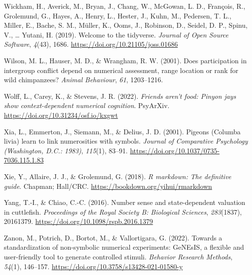 \documentclass[
  ,pub,floatsintext]{apa6}
\newlength{\cslhangindent}
\newlength{\cslentryspacingunit} %
\newenvironment{CSLReferences}[2] %
 {%
  \setlength{\parindent}{0pt}
  \ifodd #1
  \let\oldpar\par
  \def\par{\hangindent=\cslhangindent\oldpar}
  \fi
  \setlength{\parskip}{#2\cslentryspacingunit}
 }%
 {}
\begin{document}
\begin{CSLReferences}{1}{0}
\leavevmode{}%
Wickham, H., Averick, M., Bryan, J., Chang, W., McGowan, L. D., François, R., Grolemund, G., Hayes, A., Henry, L., Hester, J., Kuhn, M., Pedersen, T. L., Miller, E., Bache, S. M., Müller, K., Ooms, J., Robinson, D., Seidel, D. P., Spinu, V., \ldots{} Yutani, H. (2019). Welcome to the {tidyverse}. \emph{Journal of Open Source Software}, \emph{4}(43), 1686. \url{https://doi.org/10.21105/joss.01686}

\leavevmode{}%
Wilson, M. L., Hauser, M. D., \& Wrangham, R. W. (2001). Does participation in intergroup conflict depend on numerical assessment, range location or rank for wild chimpanzees? \emph{Animal Behaviour}, \emph{61}, 1203--1216.

\leavevmode{}%
Wolff, L., Carey, K., \& Stevens, J. R. (2022). \emph{Friends aren't food: Pinyon jays show context-dependent numerical cognition}. PsyArXiv. \url{https://doi.org/10.31234/osf.io/kxgwt}

\leavevmode{}%
Xia, L., Emmerton, J., Siemann, M., \& Delius, J. D. (2001). Pigeons ({Columba} livia) learn to link numerosities with symbols. \emph{Journal of Comparative Psychology (Washington, D.C.: 1983)}, \emph{115}(1), 83--91. \url{https://doi.org/10.1037/0735-7036.115.1.83}

\leavevmode{}%
Xie, Y., Allaire, J. J., \& Grolemund, G. (2018). \emph{R markdown: The definitive guide}. Chapman; Hall/CRC. \url{https://bookdown.org/yihui/rmarkdown}

\leavevmode{}%
Yang, T.-I., \& Chiao, C.-C. (2016). Number sense and state-dependent valuation in cuttlefish. \emph{Proceedings of the Royal Society B: Biological Sciences}, \emph{283}(1837), 20161379. \url{https://doi.org/10.1098/rspb.2016.1379}

\leavevmode{}%
Zanon, M., Potrich, D., Bortot, M., \& Vallortigara, G. (2022). Towards a standardization of non-symbolic numerical experiments: {GeNEsIS}, a flexible and user-friendly tool to generate controlled stimuli. \emph{Behavior Research Methods}, \emph{54}(1), 146--157. \url{https://doi.org/10.3758/s13428-021-01580-y}

\end{CSLReferences}

\newpage
\clearpage
\end{document}
